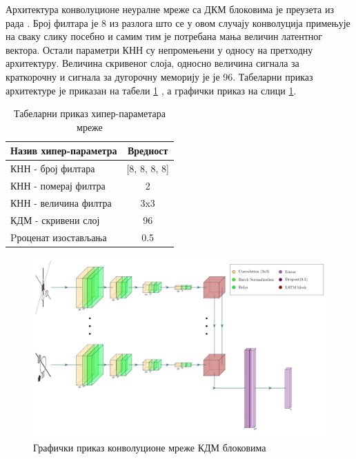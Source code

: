 \documentclass[a4paper, 12pt, master, utf8]{etf}
\begin{document}
Архитектура конволуционе неуралне мреже са ДКМ блоковима је преузета из рада \cite{barrett_measuring_2018}.
Број филтара је 8 из разлога што се у овом случају конволуција примењује на сваку слику посебно и самим тим је потребана мања величин латентног вектора.
Остали параметри КНН су непромењени у односу на претходну архитектуру. 
Величина скривеног слоја, односно величина сигнала за краткорочну и сигнала за дугорочну меморију је је 96.
Табеларни приказ архитектуре је 
приказан на табели \ref{tab:cnnlstm} , а графички приказ на слици \ref{fig:cnnlstm}.

\begin{table}[h]
    \centering
    \begin{tabular}{l | c}
    \hline
    Назив хипер-параметра & Вредност\\
    \hline
        КНН - број филтара & [8, 8, 8, 8]\\
        КНН - померај филтра & 2\\
        КНН - величина филтра & 3x3\\
        КДМ - скривени слој & 96\\
        Pроценат изостављања & 0.5
    \end{tabular}
    \caption{Табеларни приказ хипер-параметара мреже}
    \label{tab:cnnlstm}
\end{table}

\begin{figure}[h]
    \centering
    \includegraphics[width=\textwidth]{arhitekture/cnn_lstm.pdf}
    \caption{Графички приказ конволуционе мреже КДМ блоковима}
    \label{fig:cnnlstm}
\end{figure}
\end{document}
